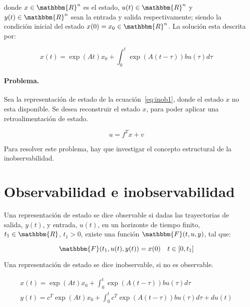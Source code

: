 	donde $x \in \mathbbm{R}^n$ es el estado, $u(t) \in \mathbbm{R}^n$ y $y(t) \in \mathbbm{R}^n$ sean la entrada y salida respectivamente; siendo la condición inicial del estado $x(0) = x_0 \in \mathbbm{R}^n$. La solución esta descrita por:

	\begin{equation*}
		x(t) = \exp{(At)} x_0 + \int_0^t \exp{\left(A(t - \tau)\right)} b u(\tau) d\tau
	\end{equation*}

	\paragraph{Problema.}

	Sea la representación de estado de la ecuación~\ref{eq:inob1}, donde el estado $x$ no esta disponible. Se desea reconstruir el estado $x$, para poder aplicar una retroalimentación de estado.

	\begin{equation}
		u = f^T x + v
	\end{equation}

	Para resolver este problema, hay que investigar el concepto estructural de la inobservabilidad.


	\newpage
    \section{Observabilidad e inobservabilidad}

	    Una representación de estado se dice observable si dadas las trayectorias de salida, $y(t)$, y entrada, $u(t)$, en un horizonte de tiempo finito, $t_1 \in \mathbbm{R}$, $t_1 > 0$, existe una función $\mathbbm{F}(t, u, y)$, tal que:

	    \begin{equation}
	    	\mathbbm{F}(t_1, u(t), y(t)) = x(0) \quad t \in [0, t_1]
	    \end{equation}

	    Una representación de estado se dice inobservable, si no es observable.

	    \begin{eqnarray} \label{eq:inob2}
			x(t) = \exp{(At)} x_0 + \int_0^t \exp{\left(A(t - \tau)\right)} b u(\tau) d\tau \nonumber \\
			y(t) = c^T \exp{(At)} x_0 + \int_0^t c^T \exp{\left(A(t - \tau)\right)} b u(\tau) d\tau +d u(t)
		\end{eqnarray}

